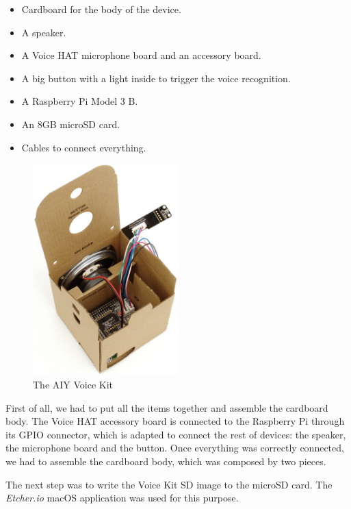 \begin{itemize}
    \item Cardboard for the body of the device.
    \item A speaker.
    \item A Voice HAT microphone board and an accessory board.
    \item A big button with a light inside to trigger the voice recognition.
    \item A Raspberry Pi Model 3 B.
    \item An 8GB microSD card.
    \item Cables to connect everything.
\end{itemize}

\begin{figure}
    \centering
    \includegraphics[width=0.5\textwidth]{images/Chapter_07/aiy-voice-kit.jpeg}
    \caption{The AIY Voice Kit}
    \label{fig:aiy-voice-kit}
\end{figure}

First of all, we had to put all the items together and assemble the cardboard body. The Voice HAT accessory board is connected to the
Raspberry Pi through its GPIO connector, which is adapted to connect the rest of devices: the speaker, the microphone board and the
button. Once everything was correctly connected, we had to assemble the cardboard body, which was composed by two
pieces.\cite{aiyProjectsVoice}

The next step was to write the Voice Kit SD image\cite{voiceKitSdImage} to the microSD card. The \textit{Etcher.io} macOS application
was used for this purpose.

